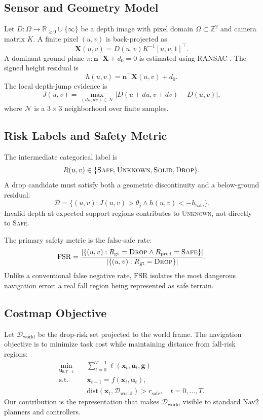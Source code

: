 \documentclass[journal]{IEEEtran}
\newcommand{\fsr}{\mathrm{FSR}}
\newcommand{\drop}{\textsc{Drop}}
\newcommand{\safe}{\textsc{Safe}}
\newcommand{\unc}{\textsc{Unknown}}
\newcommand{\solid}{\textsc{Solid}}
\newcommand{\R}{\mathbb{R}}
\newcommand{\Z}{\mathbb{Z}}
\begin{document}
\subsection{Sensor and Geometry Model}
Let $D:\Omega\rightarrow\R_{\geq0}\cup\{\infty\}$ be a depth image with pixel domain
$\Omega\subset\Z^2$ and camera matrix $K$. A finite pixel $(u,v)$ is back-projected as
\begin{equation}
\mathbf{X}(u,v)=D(u,v)K^{-1}[u,v,1]^\top .
\end{equation}
A dominant ground plane $\pi:\mathbf{n}^\top\mathbf{X}+d_0=0$ is estimated using RANSAC
\cite{fischler1981ransac}. The signed height residual is
\begin{equation}
h(u,v)=\mathbf{n}^\top\mathbf{X}(u,v)+d_0.
\end{equation}
The local depth-jump evidence is
\begin{equation}
J(u,v)=\max_{(du,dv)\in\mathcal{N}}
|D(u+du,v+dv)-D(u,v)|,
\end{equation}
where $\mathcal{N}$ is a $3\times3$ neighborhood over finite samples.

\subsection{Risk Labels and Safety Metric}
The intermediate categorical label is
\[
R(u,v)\in\{\safe,\unc,\solid,\drop\}.
\]
A drop candidate must satisfy both a geometric discontinuity and a below-ground residual:
\begin{equation}
\mathcal{D}=\{(u,v):J(u,v)>\theta_j\wedge h(u,v)<-h_\mathrm{safe}\}.
\label{eq:drop_def}
\end{equation}
Invalid depth at expected support regions contributes to \unc, not directly to \safe.

The primary safety metric is the false-safe rate:
\begin{equation}
\fsr=
\frac{|\{(u,v):R_\mathrm{gt}=\drop\wedge R_\mathrm{pred}=\safe\}|}
{|\{(u,v):R_\mathrm{gt}=\drop\}|}.
\label{eq:fsr}
\end{equation}
Unlike a conventional false negative rate, $\fsr$ isolates the most dangerous navigation
error: a real fall region being represented as safe terrain.

\subsection{Costmap Objective}
Let $\mathcal{D}_\mathrm{world}$ be the drop-risk set projected to the world frame. The
navigation objective is to minimize task cost while maintaining distance from fall-risk
regions:
\begin{align}
\min_{\mathbf{u}_{0:T-1}} \quad &
\sum_{t=0}^{T-1}\ell(\mathbf{x}_t,\mathbf{u}_t,\mathbf{g}) \nonumber\\
\mathrm{s.t.}\quad&
\mathbf{x}_{t+1}=f(\mathbf{x}_t,\mathbf{u}_t), \nonumber\\
&\mathrm{dist}(\mathbf{x}_t,\mathcal{D}_\mathrm{world})>r_\mathrm{safe},
\quad t=0,\ldots,T .
\label{eq:opt}
\end{align}
Our contribution is the representation that makes $\mathcal{D}_\mathrm{world}$ visible to
standard Nav2 planners and controllers.
\end{document}
